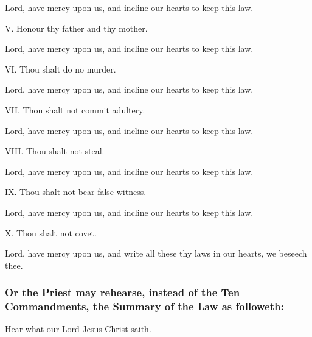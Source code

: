 \R Lord, have mercy upon us, and incline our hearts to keep this law.

V. Honour thy father and thy mother.%


\R Lord, have mercy upon us, and incline our hearts to keep this law.

VI. Thou shalt do no murder.

\R Lord, have mercy upon us, and incline our hearts to keep this law.

VII. Thou shalt not commit adultery.
    
\R Lord, have mercy upon us, and incline our hearts to keep this law.

VIII. Thou shalt not steal.

\R Lord, have mercy upon us, and incline our hearts to keep this law.

IX. Thou shalt not bear false witness.%


\R Lord, have mercy upon us, and incline our hearts to keep this law.

X. Thou shalt not covet.%

\R Lord, have mercy upon us, and write all these thy laws in our hearts, we beseech thee.

\medskip

\subsubsection{Or the Priest may rehearse, instead of the Ten Commandments, the Summary of the Law as followeth:}

\centerline{Hear what our Lord Jesus Christ saith.}
 


